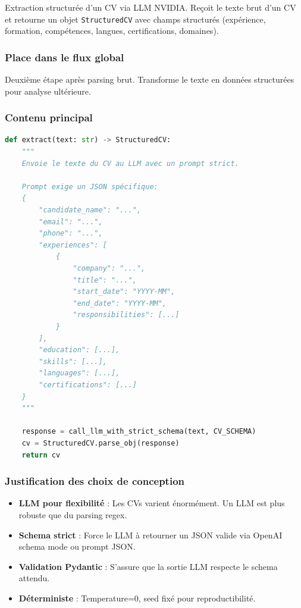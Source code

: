 \documentclass[12pt,a4paper,oneside]{book}
\begin{document}
Extraction structurée d'un CV via LLM NVIDIA. Reçoit le texte brut d'un CV et retourne un objet \texttt{StructuredCV} avec champs structurés (expérience, formation, compétences, langues, certifications, domaines).

\subsubsection{Place dans le flux global}

Deuxième étape après parsing brut. Transforme le texte en données structurées pour analyse ultérieure.

\subsubsection{Contenu principal}

\begin{lstlisting}[language=Python]
def extract(text: str) -> StructuredCV:
    """
    Envoie le texte du CV au LLM avec un prompt strict.
    
    Prompt exige un JSON spécifique:
    {
        "candidate_name": "...",
        "email": "...",
        "phone": "...",
        "experiences": [
            {
                "company": "...",
                "title": "...",
                "start_date": "YYYY-MM",
                "end_date": "YYYY-MM",
                "responsibilities": [...]
            }
        ],
        "education": [...],
        "skills": [...],
        "languages": [...],
        "certifications": [...]
    }
    """
    
    response = call_llm_with_strict_schema(text, CV_SCHEMA)
    cv = StructuredCV.parse_obj(response)
    return cv
\end{lstlisting}

\subsubsection{Justification des choix de conception}

\begin{itemize}
    \item \textbf{LLM pour flexibilité} : Les CVs varient énormément. Un LLM est plus robuste que du parsing regex.
    
    \item \textbf{Schema strict} : Force le LLM à retourner un JSON valide via OpenAI schema mode ou prompt JSON.
    
    \item \textbf{Validation Pydantic} : S'assure que la sortie LLM respecte le schema attendu.
    
    \item \textbf{Déterministe} : Temperature=0, seed fixé pour reproductibilité.
\end{itemize}
\end{document}
